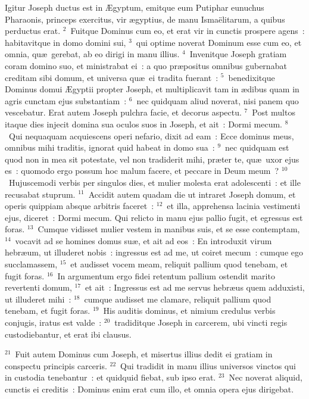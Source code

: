 \lettrine[lines=3,image=true,loversize=0.05,lraise=-0.03]{I}{}gitur Joseph ductus est in \AE gyptum, emitque eum Putiphar eunuchus Pharaonis, princeps exercitus, vir \ae gyptius, de manu Isma\"elitarum, a quibus perductus erat.
${}^{2}$~Fuitque Dominus cum eo, et erat vir in cunctis prospere agens~: habitavitque in domo domini sui,
${}^{3}$~qui optime noverat Dominum esse cum eo, et omnia, qu\ae\ gerebat, ab eo dirigi in manu illius.
${}^{4}$~Invenitque Joseph gratiam coram domino suo, et ministrabat ei~: a quo pr\ae positus omnibus gubernabat creditam sibi domum, et universa qu\ae\ ei tradita fuerant~:
${}^{5}$~benedixitque Dominus domui \AE gyptii propter Joseph, et multiplicavit tam in \ae dibus quam in agris cunctam ejus substantiam~:
${}^{6}$~nec quidquam aliud noverat, nisi panem quo vescebatur. Erat autem Joseph pulchra facie, et decorus aspectu.
${}^{7}$~Post multos itaque dies injecit domina sua oculos suos in Joseph, et ait~: Dormi mecum.
${}^{8}$~Qui nequaquam acquiescens operi nefario, dixit ad eam~: Ecce dominus meus, omnibus mihi traditis, ignorat quid habeat in domo sua~:
${}^{9}$~nec quidquam est quod non in mea sit potestate, vel non tradiderit mihi, pr\ae ter te, qu\ae\ uxor ejus es~: quomodo ergo possum hoc malum facere, et peccare in Deum meum~?
${}^{10}$~Hujuscemodi verbis per singulos dies, et mulier molesta erat adolescenti~: et ille recusabat stuprum.
${}^{11}$~Accidit autem quadam die ut intraret Joseph domum, et operis quippiam absque arbitris faceret~:
${}^{12}$~et illa, apprehensa lacinia vestimenti ejus, diceret~: Dormi mecum. Qui relicto in manu ejus pallio fugit, et egressus est foras.
${}^{13}$~Cumque vidisset mulier vestem in manibus suis, et se esse contemptam,
${}^{14}$~vocavit ad se homines domus su\ae , et ait ad eos~: En introduxit virum hebr\ae um, ut illuderet nobis~: ingressus est ad me, ut coiret mecum~: cumque ego succlamassem,
${}^{15}$~et audisset vocem meam, reliquit pallium quod tenebam, et fugit foras.
${}^{16}$~In argumentum ergo fidei retentum pallium ostendit marito revertenti domum,
${}^{17}$~et ait~: Ingressus est ad me servus hebr\ae us quem adduxisti, ut illuderet mihi~:
${}^{18}$~cumque audisset me clamare, reliquit pallium quod tenebam, et fugit foras.
${}^{19}$~His auditis dominus, et nimium credulus verbis conjugis, iratus est valde~:
${}^{20}$~tradiditque Joseph in carcerem, ubi vincti regis custodiebantur, et erat ibi clausus.


${}^{21}$~Fuit autem Dominus cum Joseph, et misertus illius dedit ei gratiam in conspectu principis carceris.
${}^{22}$~Qui tradidit in manu illius universos vinctos qui in custodia tenebantur~: et quidquid fiebat, sub ipso erat.
${}^{23}$~Nec noverat aliquid, cunctis ei creditis~: Dominus enim erat cum illo, et omnia opera ejus dirigebat.

